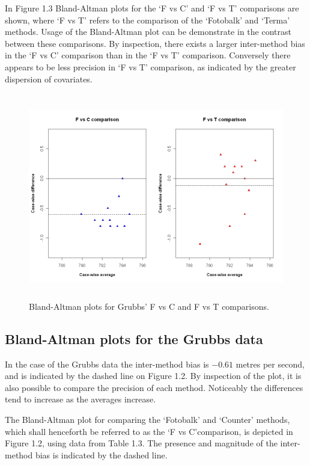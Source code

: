 \documentclass[Main.tex]{subfiles}
\begin{document}
	
	
	In Figure 1.3 Bland-Altman plots for the `F vs C' and `F vs T'
	comparisons are shown, where `F vs T' refers to the comparison of
	the `Fotobalk' and `Terma' methods. Usage of the Bland-Altman plot
	can be demonstrate in the contrast between these comparisons. By inspection, there exists a larger inter-method bias in the `F vs C' comparison than in the `F vs T' comparison. Conversely there
	appears to be less precision in `F vs T' comparison, as indicated
	by the greater dispersion of covariates.
	
	\begin{figure}[h!]
		\begin{center}
			\includegraphics[height=90mm]{images/GrubbsDataTwoBAplots.jpeg}
			\caption{Bland-Altman plots for Grubbs' F vs C and F vs T comparisons.}\label{GrubbsDataTwoBAplots}
		\end{center}
	\end{figure}
	
	\newpage

\subsection{Bland-Altman plots for the Grubbs data}

In the case of the Grubbs data the inter-method bias is $-0.61$ metres per second, and is indicated by the dashed line on Figure 1.2. By inspection of the plot, it is also possible to compare the precision of each method. Noticeably the differences tend to increase as the averages increase.


The Bland-Altman plot for comparing the `Fotobalk' and `Counter' methods, which shall henceforth be referred to as the `F vs C'comparison,  is depicted in Figure 1.2, using data from Table 1.3. The presence and magnitude of the inter-method bias is indicated	by the dashed line.
\end{document}
